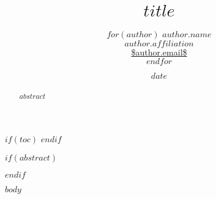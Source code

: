 \documentclass[12pt, a4paper]{article}
\title{$title$}
\author{$for(author)$ {\bf $author.name$} \\ \normalsize\emph{$author.affiliation$} \\ \url{$author.email$}\vspace{0.1in}\\$endfor$ }
\date{$date$}
\begin{document}
\thispagestyle{empty} %

{\LARGE \bf \thetitle \vspace{0.2in}}

\theauthor

$if(toc)$
{
\hypersetup{linkcolor=black}
\setcounter{tocdepth}{$toc-depth$}
\tableofcontents
}
$endif$

$if(abstract)$
\begin{abstract}
$abstract$
\end{abstract}
$endif$

$body$
\end{document}
